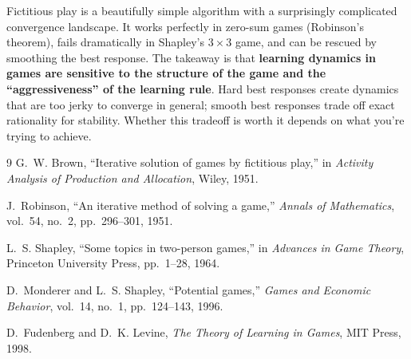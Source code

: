 \documentclass[11pt]{article}
\begin{document}
Fictitious play is a beautifully simple algorithm with a surprisingly complicated convergence landscape. It works perfectly in zero-sum games (Robinson's theorem), fails dramatically in Shapley's $3 \times 3$ game, and can be rescued by smoothing the best response. The takeaway is that \textbf{learning dynamics in games are sensitive to the structure of the game and the ``aggressiveness'' of the learning rule}. Hard best responses create dynamics that are too jerky to converge in general; smooth best responses trade off exact rationality for stability. Whether this tradeoff is worth it depends on what you're trying to achieve.

\begin{thebibliography}{9}
 G.~W. Brown, ``Iterative solution of games by fictitious play,'' in \textit{Activity Analysis of Production and Allocation}, Wiley, 1951.

 J.~Robinson, ``An iterative method of solving a game,'' \textit{Annals of Mathematics}, vol.~54, no.~2, pp.~296--301, 1951.

 L.~S. Shapley, ``Some topics in two-person games,'' in \textit{Advances in Game Theory}, Princeton University Press, pp.~1--28, 1964.

 D.~Monderer and L.~S. Shapley, ``Potential games,'' \textit{Games and Economic Behavior}, vol.~14, no.~1, pp.~124--143, 1996.

 D.~Fudenberg and D.~K. Levine, \textit{The Theory of Learning in Games}, MIT Press, 1998.
\end{thebibliography}
\end{document}
